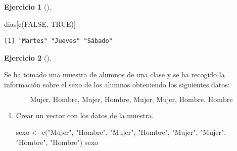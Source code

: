 \documentclass[
  a4paper,
]{scrreport}
\newenvironment{Shaded}{\begin{snugshade}}{\end{snugshade}}
\newcommand{\ConstantTok}[1]{\textcolor[rgb]{0.56,0.35,0.01}{#1}}
\newcommand{\FunctionTok}[1]{\textcolor[rgb]{0.28,0.35,0.67}{#1}}
\newcommand{\NormalTok}[1]{\textcolor[rgb]{0.00,0.23,0.31}{#1}}
\newcommand{\OtherTok}[1]{\textcolor[rgb]{0.00,0.23,0.31}{#1}}
\newcommand{\StringTok}[1]{\textcolor[rgb]{0.13,0.47,0.30}{#1}}
\theoremstyle{definition}
\newtheorem{exercise}{Ejercicio}[chapter]
\theoremstyle{remark}
\begin{document}
\begin{exercise}[]
\begin{enumerate}
\begin{tcolorbox}
\begin{Shaded}
\begin{Highlighting}[]
\NormalTok{dias[}\FunctionTok{c}\NormalTok{(}\ConstantTok{FALSE}\NormalTok{, }\ConstantTok{TRUE}\NormalTok{)]}
\end{Highlighting}
\end{Shaded}

\begin{verbatim}
[1] "Martes" "Jueves" "Sábado"
\end{verbatim}

  \end{tcolorbox}
\end{enumerate}

\end{exercise}

\begin{exercise}[]\protect\hypertarget{exr-factores-1}{}\label{exr-factores-1}

Se ha tomado una muestra de alumnos de una clase y se ha recogido la
información sobre el sexo de los alumnos obteniendo los siguientes
datos:

\[
\mbox{Mujer, Hombre, Mujer, Hombre, Mujer, Mujer, Hombre, Hombre}
\]

\begin{enumerate}
\def\labelenumi{\alph{enumi}.}
\item
  Crear un vector con los datos de la muestra.

  \begin{tcolorbox}[enhanced jigsaw, breakable, toptitle=1mm, colbacktitle=quarto-callout-tip-color!10!white, rightrule=.15mm, opacityback=0, opacitybacktitle=0.6, titlerule=0mm, coltitle=black, colframe=quarto-callout-tip-color-frame, colback=white, bottomtitle=1mm, leftrule=.75mm, toprule=.15mm, title=\textcolor{quarto-callout-tip-color}{\faLightbulb}\hspace{0.5em}{Solución}, arc=.35mm, bottomrule=.15mm, left=2mm]

\begin{Shaded}
\begin{Highlighting}[]
\NormalTok{sexo }\OtherTok{\textless{}{-}} \FunctionTok{c}\NormalTok{(}\StringTok{"Mujer"}\NormalTok{, }\StringTok{"Hombre"}\NormalTok{, }\StringTok{"Mujer"}\NormalTok{, }\StringTok{"Hombre"}\NormalTok{, }\StringTok{"Mujer"}\NormalTok{, }\StringTok{"Mujer"}\NormalTok{, }\StringTok{"Hombre"}\NormalTok{, }\StringTok{"Hombre"}\NormalTok{)}
\NormalTok{sexo}
\end{Highlighting}
\end{Shaded}


\end{tcolorbox}
\end{enumerate}
\end{exercise}
\end{document}
